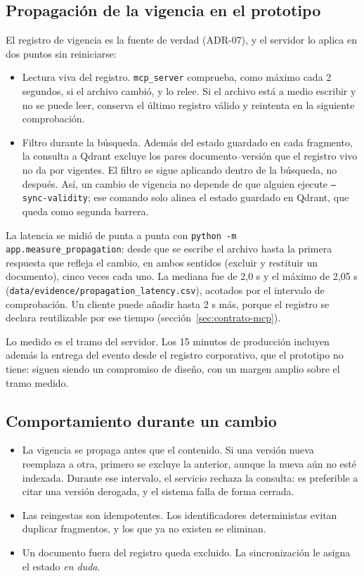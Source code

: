 \subsection{Propagación de la vigencia en el prototipo}

El registro de vigencia es la fuente de verdad (ADR-07), y el servidor lo aplica en dos puntos sin reiniciarse:

\begin{itemize}
  \item Lectura viva del registro. \texttt{mcp\_server} comprueba, como máximo cada 2 segundos, si el archivo cambió, y lo relee. Si el archivo está a medio escribir y no se puede leer, conserva el último registro válido y reintenta en la siguiente comprobación.
  \item Filtro durante la búsqueda. Además del estado guardado en cada fragmento, la consulta a Qdrant excluye los pares documento--versión que el registro vivo no da por vigentes. El filtro se sigue aplicando dentro de la búsqueda, no después. Así, un cambio de vigencia no depende de que alguien ejecute \texttt{--sync-validity}; ese comando solo alinea el estado guardado en Qdrant, que queda como segunda barrera.
\end{itemize}

La latencia se midió de punta a punta con \texttt{python -m app.measure\_propagation}: desde que se escribe el archivo hasta la primera respuesta que refleja el cambio, en ambos sentidos (excluir y restituir un documento), cinco veces cada uno. La mediana fue de 2,0 s y el máximo de 2,05 s (\texttt{data/evidence/propagation\_latency.csv}), acotados por el intervalo de comprobación. Un cliente puede añadir hasta 2 s más, porque el registro se declara reutilizable por ese tiempo (sección~\ref{sec:contrato-mcp}).

Lo medido es el tramo del servidor. Los 15 minutos de producción incluyen además la entrega del evento desde el registro corporativo, que el prototipo no tiene: siguen siendo un compromiso de diseño, con un margen amplio sobre el tramo medido.

\subsection{Comportamiento durante un cambio}

\begin{itemize}
  \item La vigencia se propaga antes que el contenido. Si una versión nueva reemplaza a otra, primero se excluye la anterior, aunque la nueva aún no esté indexada. Durante ese intervalo, el servicio rechaza la consulta: es preferible a citar una versión derogada, y el sistema falla de forma cerrada.
  \item Las reingestas son idempotentes. Los identificadores deterministas evitan duplicar fragmentos, y los que ya no existen se eliminan.
  \item Un documento fuera del registro queda excluido. La sincronización le asigna el estado \emph{en duda}.
\end{itemize}

